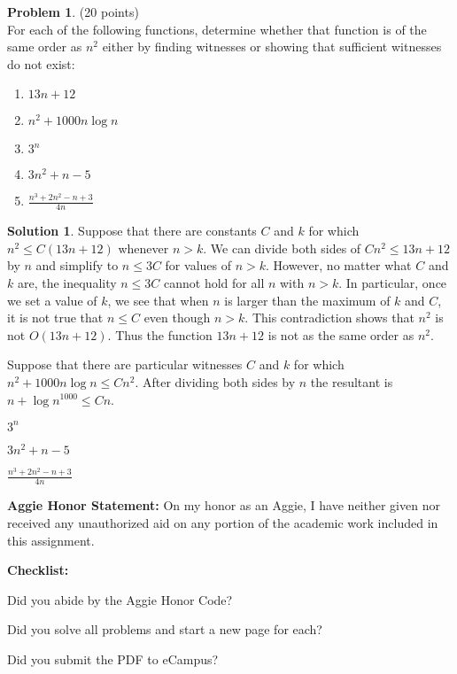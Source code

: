 \documentclass{article}
\theoremstyle{definition}
\newtheorem{problem}{Problem}
\newtheorem*{solution}{Solution}
\newcommand{\honor}{\noindent \textbf{Aggie Honor Statement: }On my honor as an Aggie, I have neither
  given nor received any unauthorized aid on any portion of the academic work included in this assignment.
}
\newcommand{\checklist}{\noindent\textbf{Checklist:}
\begin{compactenum}
\item Did you abide by the Aggie Honor Code?
\item Did you solve all problems and start a new page for each? 
\item Did you submit the PDF to eCampus?
\end{compactenum}
}
\begin{document}

\newpage

\begin{problem} (20 points)\\
For each of the following functions, determine whether that function is of the same order as $n^2$ either by finding witnesses or showing that sufficient witnesses do not exist:
\begin{enumerate}
\item $13n+12$
\item $n^2+1000 n\log{n}$
\item $3^n$
\item $3n^2+n-5$
\item $\displaystyle \frac{n^3+2n^2-n+3}{4n}$
\end{enumerate}
\end{problem}



\begin{solution}

\item Suppose that there are constants $C$ and $k$ for which $n^2 \leq C(13n+12)$ whenever $n > k$. We can divide both 
		sides of $Cn^2 \leq 13n+12$ by $n$ and simplify to $n \leq 3C$ for values of $n > k$. However, no matter what 
        $C$ and $k$ are, the inequality $n \leq 3C$ cannot hold for all $n$ with $n > k$. In particular, once we set a 
        value of $k$, we see that when $n$ is larger than the maximum of $k$ and $C$, it is not true that $n \leq C$ 
        even though $n > k$. This contradiction shows that $n^2$ is not $O(13n+12)$. Thus the function $13n+12$ is not 
        as the same order as $n^2$.
\item Suppose that there are particular witnesses $C$ and $k$ for which $n^2+1000n\log{n} \leq Cn^2$. After dividing both sides by $n$ the resultant is $ n + \log{{n}^{1000}}\leq Cn$.
\item $3^n$
\item $3n^2+n-5$
\item $\displaystyle \frac{n^3+2n^2-n+3}{4n}$

\end{solution}

\newpage


\bigskip
\honor

\bigskip
\checklist
\end{document}
